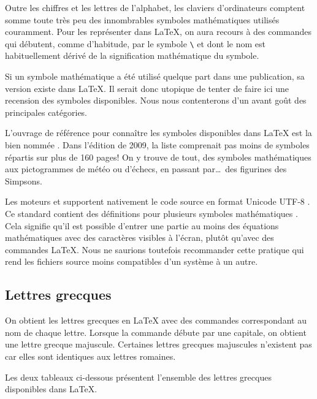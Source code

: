 Outre les chiffres et les lettres de l'alphabet, les claviers
d'ordinateurs comptent somme toute très peu des innombrables symboles
mathématiques utilisés couramment. Pour les représenter dans {\LaTeX},
on aura recours à des commandes qui débutent, comme d'habitude, par le
symbole \verb=\= et dont le nom est habituellement dérivé de la
signification mathématique du symbole.

Si un symbole mathématique a été utilisé quelque part dans une
publication, sa version existe dans {\LaTeX}. Il serait donc utopique
de tenter de faire ici une recension des symboles disponibles. Nous
nous contenterons d'un avant goût des principales catégories.

L'ouvrage de référence pour connaître les symboles disponibles dans
{\LaTeX} est la bien nommée %
. %
Dans l'édition de 2009, la liste comprenait pas moins de 
symboles répartis sur plus de 160 pages! On y trouve de tout, des
symboles mathématiques aux pictogrammes de météo ou d'échecs, en
passant par\dots\ des figurines des Simpsons.

\begin{important}
  Les moteurs {\XeTeX} et {\LuaTeX} supportent nativement le code
  source en format Unicode UTF-8 \citep{Unicode:5.0}. Ce standard
  contient des définitions pour plusieurs symboles mathématiques
  \citep{wikipedia:unicode-math}. Cela signifie qu'il est possible
  d'entrer une partie au moins des équations mathématiques avec des
  caractères visibles à l'écran, plutôt qu'avec des commandes {\LaTeX}.
  Nous ne saurions toutefois recommander cette pratique qui rend les
  fichiers source moins compatibles d'un système à un autre.
\end{important}

\subsection{Lettres grecques}
\label{sec:math:symboles:grecques}

On obtient les lettres grecques en {\LaTeX} avec des commandes
correspondant au nom de chaque lettre. Lorsque la commande débute par
une capitale, on obtient une lettre grecque majuscule. Certaines
lettres grecques majuscules n'existent pas car elles sont identiques
aux lettres romaines.

Les deux tableaux ci-dessous présentent l'ensemble des lettres
grecques disponibles dans {\LaTeX}.

